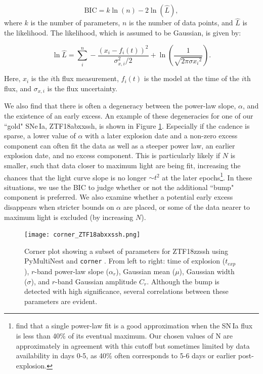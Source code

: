 \documentclass[twocolumn,twocolappendix, linenumbers]{aastex631} %
\begin{document}
\begin{equation}
    \text{BIC} = k \ln(n) - 2 \ln(\hat L),
\end{equation}
where $k$ is the number of parameters, $n$ is the number of data points, and $\hat L$ is the likelihood. The likelihood, which is assumed to be Gaussian, is given by: 

\begin{equation}
    \ln{\hat L} = \sum_i^n -\frac{(x_i - f_i(t))^2}{\sigma_{x,i}^2/2} + \ln(\frac{1}{\sqrt{2\pi \sigma{x_i}^2}}).
\end{equation}

\noindent Here, $x_i$ is the $i$th flux measurement, $f_i(t)$ is the model at the time of the $i$th flux, and $\sigma_{x,i}$ is the flux uncertainty. 

We also find that there is often a degeneracy between the power-law slope, $\alpha$, and the existence of an early excess.  An example of these degeneracies for one of our ``gold" SNe\,Ia, ZTF18abxxssh, is shown in Figure \ref{fig:multinest}.  Especially if the cadence is sparse, a lower value of $\alpha$ with a later explosion date and a non-zero excess component can often fit the data as well as a steeper power law, an earlier explosion date, and no excess component. This is particularly likely if $N$ is smaller, such that data closer to maximum light are being fit, increasing the chances that the light curve slope is no longer $\sim t^2$ at the later epochs\footnote{\citet{Olling15} find that a single power-law fit is a good approximation when the SN\,Ia flux is less than 40\% of its eventual maximum. Our chosen values of N are approximately in agreement with this cutoff but sometimes limited by data availability in days 0-5, as 40\% often corresponds to 5-6 days or earlier post-explosion.}. In these situations, we use the BIC to judge whether or not the additional ``bump" component is preferred. We also examine whether a potential early excess disappears when stricter bounds on $\alpha$ are placed, or some of the data nearer to maximum light is excluded (by increasing $N$).

\begin{figure}
    \centering
    \texttt{[image: corner\_ZTF18abxxssh.png]}
    \caption{Corner plot showing a subset of parameters for ZTF18zzssh using PyMultiNest and {\tt corner} \citep{Buchner14,corner}. 
 From left to right: time of explosion ($t_{exp}$), $r$-band power-law slope ($\alpha_r$), Gaussian mean ($\mu$), Gaussian width ($\sigma$), and $r$-band Gaussian amplitude $C_r$.  Although the bump is detected with high significance, several correlations between these parameters are evident.}
    \label{fig:multinest}
\end{figure}
\end{document}
